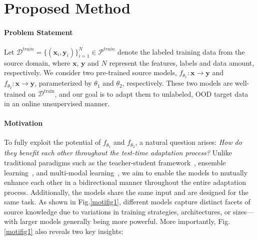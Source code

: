 \vspace{-0.1in}
\section{Proposed Method}
\label{sec:Method Section}
\paragraph{Problem Statement} 
Let $\mathcal{D}^{train} = \{\left(\textbf{x}_i, \textbf{y}_i \right)\}_{i=1}^{N} \in \mathcal{P}^{train}$ denote the labeled training data from the source domain, where $\mathbf{x}$, $\mathbf{y}$ and $N$ represent the features, labels and data
amount, respectively. We consider two pre-trained source models, $f_{\theta_1}: \mathbf{x} \rightarrow \mathbf{y}$ and $f_{\theta_2}: \mathbf{x} \rightarrow \mathbf{y}$, parameterized by $\theta_1$ and $\theta_2$, respectively. These two models are well-trained on $\mathcal{D}^{\text{train}}$, and our goal is to adapt them to unlabeled, OOD target data in an online unsupervised manner. 

\vspace{-12pt}
\paragraph{Motivation} To fully exploit the potential of $f_{\theta_1}$ and $f_{\theta_2}$, a natural question arises: \textit{How do they benefit each other throughout the test-time adaptation process?} Unlike traditional paradigms such as the teacher-student framework~\cite{hu2022teacher}, ensemble learning~\cite{yang2023survey}, and multi-modal learning~\cite{yin2023crossmatch}, we aim to enable the models to mutually enhance each other in a bidirectional manner throughout the entire adaptation process. Additionally, the models share the same input and are designed for the same task. As shown in Fig.\ref{motifig1}, different models capture distinct facets of source knowledge due to variations in training strategies, architectures, or sizes—with larger models generally being more powerful. More importantly, Fig.\ref{motifig1} also reveals two key insights: 

